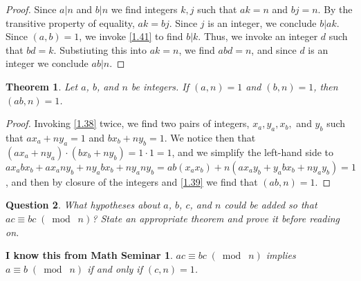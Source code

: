 \documentclass{article}
\newtheorem{thm}{Theorem}[section]
\newtheorem{ques}[thm]{Question}
\numberwithin{equation}{thm}
\providecommand{\gmod}[1]{\; (\bmod \; #1)}
\begin{document}
\begin{proof}
  Since $a | n$ and $b | n$ we find integers $k, j$ such that $ak = n$ and $bj = n$. By the transitive property of equality, $ak = bj$. Since $j$ is an integer, we conclude $b | ak$. Since $(a, b) = 1$, we invoke \ref{1.41} to find $b | k$. Thus, we invoke an integer $d$ such that $bd = k$. Substiuting this into $ak = n$, we find $abd = n$, and since $d$ is an integer we conclude $ab | n$.
\end{proof}



\begin{thm} \label{1.43}
  Let $a$, $b$, and $n$ be integers. If $(a,n) = 1$ and $(b, n) = 1$, then $(ab, n) = 1$.
\end{thm}

\begin{proof}
  Invoking \ref{1.38} twice, we find two pairs of integers, $x_a, y_a, x_b,$ and $y_b$ such that $ax_a + ny_a = 1$ and $bx_b + ny_b = 1$. We notice then that $(ax_a + ny_a) \cdot (bx_b + ny_b) = 1 \cdot 1 = 1$, and we simplify the left-hand side to $ax_abx_b + ax_any_b + ny_abx_b + ny_any_b = ab(x_a x_b) + n(ax_a y_b + y_a b x_b + ny_a y_b) = 1$, and then by closure of the integers and \ref{1.39} we find that $(ab, n) = 1$.
\end{proof}



\begin{ques} \label{1.44}
  What hypotheses about $a$, $b$, $c$, and $n$ could be added so that $ac \equiv bc \gmod n$? State an appropriate theorem and prove it before reading on.
\end{ques}

\newtheorem*{IKFMS}{I know this from Math Seminar}
\begin{IKFMS}
  $ac \equiv bc \gmod n$ implies $a \equiv b \gmod n$ if and only if $(c, n) = 1$.
\end{IKFMS}
\end{document}
